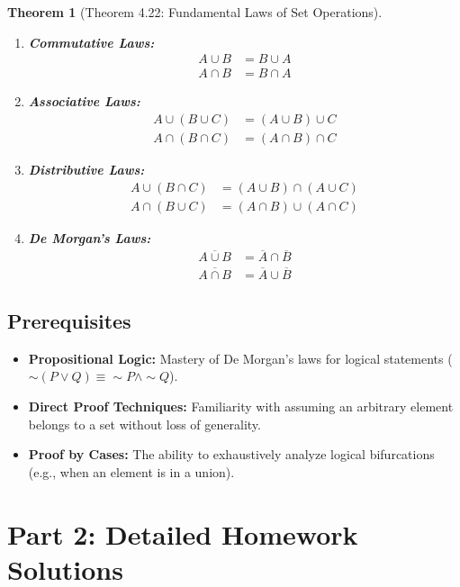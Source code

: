 \documentclass[11pt]{article}
\newtheorem{theorem}{Theorem}[section]
\theoremstyle{definition}
\begin{document}
\begin{theorem}[Theorem 4.22: Fundamental Laws of Set Operations]
\leavevmode
\begin{enumerate}
    \item \textbf{Commutative Laws:}
    \begin{align*}
        A \cup B &= B \cup A \\
        A \cap B &= B \cap A
    \end{align*}
    \item \textbf{Associative Laws:}
    \begin{align*}
        A \cup (B \cup C) &= (A \cup B) \cup C \\
        A \cap (B \cap C) &= (A \cap B) \cap C
    \end{align*}
    \item \textbf{Distributive Laws:}
    \begin{align*}
        A \cup (B \cap C) &= (A \cup B) \cap (A \cup C) \\
        A \cap (B \cup C) &= (A \cap B) \cup (A \cap C)
    \end{align*}
    \item \textbf{De Morgan's Laws:}
    \begin{align*}
        \overline{A \cup B} &= \overline{A} \cap \overline{B} \\
        \overline{A \cap B} &= \overline{A} \cup \overline{B}
    \end{align*}
\end{enumerate}
\end{theorem}

\subsection{Prerequisites}
\begin{itemize}
    \item \textbf{Propositional Logic:} Mastery of De Morgan's laws for logical statements ($\sim(P \lor Q) \equiv \sim P \land \sim Q$).
    \item \textbf{Direct Proof Techniques:} Familiarity with assuming an arbitrary element belongs to a set without loss of generality.
    \item \textbf{Proof by Cases:} The ability to exhaustively analyze logical bifurcations (e.g., when an element is in a union).
\end{itemize}

\newpage
\section{Part 2: Detailed Homework Solutions}
\end{document}
